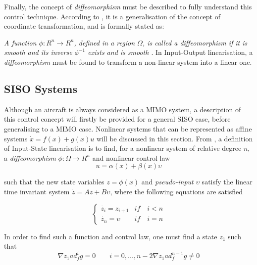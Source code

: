Finally, the concept of \emph{diffeomorphism} must be described to fully understand this control technique. According to \cite{Slotine+Li}, it is a generalisation of the concept of coordinate transformation, and is formally stated as:

\emph{A function $\phi: R^n\rightarrow R^n$, defined in a region $\Omega$, is called a diffeomorphism if it is smooth and its inverse $\phi^{-1}$ exists and is smooth \cite{Slotine+Li}}. 
In Input-Output linearisation, a \emph{diffeomorphism} must be found to transform a non-linear system into a linear one.
\subsection{SISO Systems}
\label{section:background/SISO_NLI}

Although an aircraft is always considered as a MIMO system, a description of this control concept will firstly be provided for a general SISO case, before generalising to a MIMO case. Nonlinear systems that can be represented as affine systems $\dot{x}=f(x)+g(x)u$ will be discussed in this section. From \cite{Slotine+Li}, a definition of Input-State linearisation is to find, for a nonlinear system of relative degree $n$, a \emph{diffeomorphism} $\phi:\Omega \rightarrow R^n$ and nonlinear control law
\begin{equation}
u=\alpha(x) + \beta(x)\upsilon
\label{eq:nli_control_law}
\end{equation}

such that the new state variables $z=\phi(x)$ and \emph{pseudo-input} $\upsilon$ satisfy the linear time invariant system $\dot{z} = Az+B\upsilon$, where the following equations are satisfied

\begin{equation}
	\begin{cases}
		\dot{z_i}=z_{i+1} & if\quad i<n\\
		\dot{z_n}=\upsilon & if\quad i=n
	\end{cases}
	\label{eq:SISO_state}
\end{equation}

In order to find such a function and control law, one must find a state $z_1$ such that 
\begin{subequations}
	\begin{equation}
		\nabla z_1 ad_f^ig=0 \qquad i=0, ..., n-2
	\end{equation}
	\begin{equation}
		\nabla z_1 ad_f^{n-1}g\neq 0
	\end{equation}
\end{subequations}

